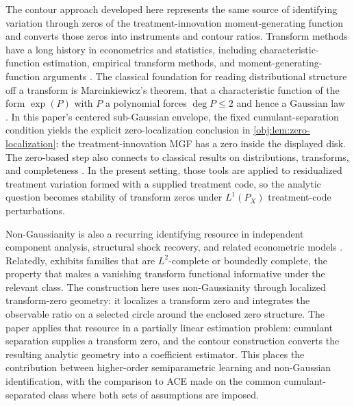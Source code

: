 \documentclass[11pt]{article}
\begin{document}
The contour approach developed here represents the same source of identifying variation through zeros of the treatment-innovation moment-generating function and converts those zeros into instruments and contour ratios. Transform methods have a long history in econometrics and statistics, including characteristic-function estimation, empirical transform methods, and moment-generating-function arguments \citep{FeuervergerMcDunnough1981,Singleton2001,ChackoViceira2003,CarrascoFlorensRenault2007,Carrasco2017}. The classical foundation for reading distributional structure off a transform is Marcinkiewicz's theorem, that a characteristic function of the form \(\exp(P)\) with \(P\) a polynomial forces \(\deg P\le2\) and hence a Gaussian law \citep{Marcinkiewicz1939}. In this paper's centered sub-Gaussian envelope, the fixed cumulant-separation condition yields the explicit zero-localization conclusion in \cref{obj:lem:zero-localization}: the treatment-innovation MGF has a zero inside the displayed disk. The zero-based step also connects to classical results on distributions, transforms, and completeness \citep{KaganLinnikRao1973,Mattner1992,DHaultfoeuille2011,DarollesFanFlorensRenault2011,HuShiu2022}. In the present setting, those tools are applied to residualized treatment variation formed with a supplied treatment code, so the analytic question becomes stability of transform zeros under \(L^1(P_X)\) treatment-code perturbations.

Non-Gaussianity is also a recurring identifying resource in independent component analysis, structural shock recovery, and related econometric models \citep{Comon1994,HyvarinenOja1997,HyvarinenKarhunenOja2001,LanneMeitzSaikkonen2017,LeeMesters2024,HoeschLeeMesters2024,ReizingerEtAl2025}. Relatedly, \citet{Andrews2017} exhibits families that are \(L^2\)-complete or boundedly complete, the property that makes a vanishing transform functional informative under the relevant class. The construction here uses non-Gaussianity through localized transform-zero geometry: it localizes a transform zero and integrates the observable ratio on a selected circle around the enclosed zero structure. The paper applies that resource in a partially linear estimation problem: cumulant separation supplies a transform zero, and the contour construction converts the resulting analytic geometry into a coefficient estimator. This places the contribution between higher-order semiparametric learning and non-Gaussian identification, with the comparison to ACE made on the common cumulant-separated class where both sets of assumptions are imposed.
\end{document}
